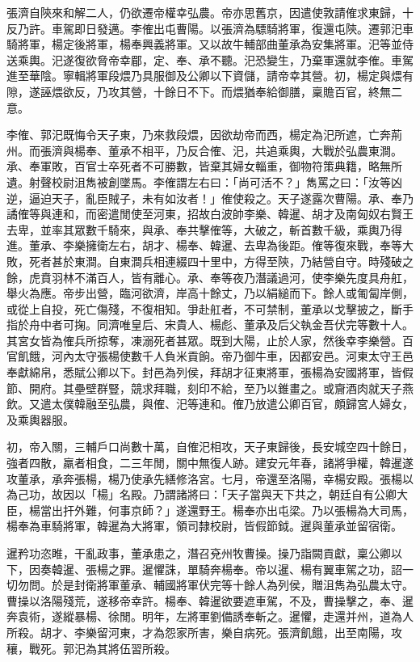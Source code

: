 \begin{pinyinscope}
張濟自陝來和解二人，仍欲遷帝權幸弘農。帝亦思舊京，因遣使敦請傕求東歸，十反乃許。車駕即日發邁。李傕出屯曹陽。以張濟為驃騎將軍，復還屯陝。遷郭汜車騎將軍，楊定後將軍，楊奉興義將軍。又以故牛輔部曲董承為安集將軍。汜等並侍送乘輿。汜遂復欲脅帝幸郿，定、奉、承不聽。汜恐變生，乃棄軍還就李傕。車駕進至華陰。寧輯將軍段煨乃具服御及公卿以下資儲，請帝幸其營。初，楊定與煨有隙，遂誣煨欲反，乃攻其營，十餘日不下。而煨猶奉給御膳，稟贍百官，終無二意。

李傕、郭汜既悔令天子東，乃來救段煨，因欲劫帝而西，楊定為汜所遮，亡奔荊州。而張濟與楊奉、董承不相平，乃反合傕、汜，共追乘輿，大戰於弘農東澗。承、奉軍敗，百官士卒死者不可勝數，皆棄其婦女輜重，御物符策典籍，略無所遺。射聲校尉沮雋被創墜馬。李傕謂左右曰：「尚可活不？」雋罵之曰：「汝等凶逆，逼迫天子，亂臣賊子，未有如汝者！」傕使殺之。天子遂露次曹陽。承、奉乃譎傕等與連和，而密遣閒使至河東，招故白波帥李樂、韓暹、胡才及南匈奴右賢王去卑，並率其眾數千騎來，與承、奉共擊傕等，大破之，斬首數千級，乘輿乃得進。董承、李樂擁衛左右，胡才、楊奉、韓暹、去卑為後距。傕等復來戰，奉等大敗，死者甚於東澗。自東澗兵相連綴四十里中，方得至陝，乃結營自守。時殘破之餘，虎賁羽林不滿百人，皆有離心。承、奉等夜乃潛議過河，使李樂先度具舟舡，舉火為應。帝步出營，臨河欲濟，岸高十餘丈，乃以絹縋而下。餘人或匍匐岸側，或從上自投，死亡傷殘，不復相知。爭赴舡者，不可禁制，董承以戈擊披之，斷手指於舟中者可掬。同濟唯皇后、宋貴人、楊彪、董承及后父執金吾伏完等數十人。其宮女皆為傕兵所掠奪，凍溺死者甚眾。既到大陽，止於人家，然後幸李樂營。百官飢餓，河內太守張楊使數千人負米貢餉。帝乃御牛車，因都安邑。河東太守王邑奉獻綿帛，悉賦公卿以下。封邑為列侯，拜胡才征東將軍，張楊為安國將軍，皆假節、開府。其壘壁群豎，競求拜職，刻印不給，至乃以錐畫之。或齎酒肉就天子燕飲。又遣太僕韓融至弘農，與傕、汜等連和。傕乃放遣公卿百官，頗歸宮人婦女，及乘輿器服。

初，帝入關，三輔戶口尚數十萬，自傕汜相攻，天子東歸後，長安城空四十餘日，強者四散，羸者相食，二三年閒，關中無復人跡。建安元年春，諸將爭權，韓暹遂攻董承，承奔張楊，楊乃使承先繕修洛宮。七月，帝還至洛陽，幸楊安殿。張楊以為己功，故因以「楊」名殿。乃謂諸將曰：「天子當與天下共之，朝廷自有公卿大臣，楊當出扞外難，何事京師？」遂還野王。楊奉亦出屯梁。乃以張楊為大司馬，楊奉為車騎將軍，韓暹為大將軍，領司隸校尉，皆假節鉞。暹與董承並留宿衛。

暹矜功恣睢，干亂政事，董承患之，潛召兗州牧曹操。操乃詣闕貢獻，稟公卿以下，因奏韓暹、張楊之罪。暹懼誅，單騎奔楊奉。帝以暹、楊有翼車駕之功，詔一切勿問。於是封衛將軍董承、輔國將軍伏完等十餘人為列侯，贈沮雋為弘農太守。曹操以洛陽殘荒，遂移帝幸許。楊奉、韓暹欲要遮車駕，不及，曹操擊之，奉、暹奔袁術，遂縱暴楊、徐閒。明年，左將軍劉備誘奉斬之。暹懼，走還并州，道為人所殺。胡才、李樂留河東，才為怨家所害，樂自病死。張濟飢餓，出至南陽，攻穰，戰死。郭汜為其將伍習所殺。


\end{pinyinscope}
